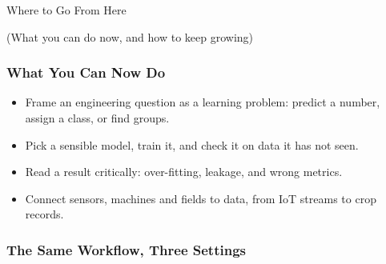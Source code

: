 
\begin{frame}[fragile]\frametitle{}
\begin{center}
{\Large Where to Go From Here}

\medskip
{\small (What you can do now, and how to keep growing)}
\end{center}
\end{frame}

\begin{frame}[fragile]\frametitle{What You Can Now Do}
\begin{itemize}
\item Frame an engineering question as a learning problem: predict a number, assign a class, or find groups.
\item Pick a sensible model, train it, and check it on data it has not seen.
\item Read a result critically: over-fitting, leakage, and wrong metrics.
\item Connect sensors, machines and fields to data, from IoT streams to crop records.
\end{itemize}
\end{frame}

\begin{frame}[fragile]\frametitle{The Same Workflow, Three Settings}
\begin{center}
\end{center}
\end{frame}

